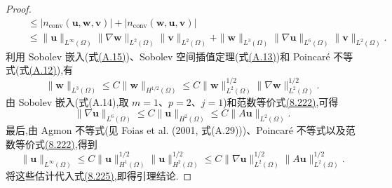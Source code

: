 \begin{lemma}[对流项的估计]
\begin{proof}
\begin{equation}
\begin{aligned}
 &\quad\le |n_{\mathrm{conv}}(\bm{u},\bm{w},\bm{v})|
            +|n_{\mathrm{conv}}(\bm{w},\bm{u},\bm{v})|\\
 &\quad\le \|\bm{u}\|_{L^\infty(\Omega)}
             \|\nabla\bm{w}\|_{L^2(\Omega)}
             \|\bm{v}\|_{L^2(\Omega)}
          +\|\bm{w}\|_{L^3(\Omega)}
             \|\nabla\bm{u}\|_{L^6(\Omega)}
             \|\bm{v}\|_{L^2(\Omega)}.
\end{aligned}
\end{equation}
利用 Sobolev 嵌入(式\hyperref[eq:appendix-a-15]{(A.15)})、Sobolev 空间插值定理(式\hyperref[eq:appendix-a-13]{(A.13)})和 Poincaré 不等式(式\hyperref[eq:appendix-a-12]{(A.12)}),有
\[
 \|\bm{w}\|_{L^3(\Omega)}
 \le C\|\bm{w}\|_{H^{1/2}(\Omega)}
 \le C\|\bm{w}\|_{L^2(\Omega)}^{1/2}
       \|\nabla\bm{w}\|_{L^2(\Omega)}^{1/2}.
\]
由 Sobolev 嵌入(式(A.14),取 $m=1$、$p=2$、$j=1$)和范数等价式\hyperref[eq:navier-stokes-alpha-stokes-norm-equivalence]{(8.222)},可得
\[
 \|\nabla\bm{u}\|_{L^6(\Omega)}
 \le C\|\bm{u}\|_{H^2(\Omega)}
 \le C\|A\bm{u}\|_{L^2(\Omega)}.
\]
最后,由 Agmon 不等式(见 Foias et al. (2001, 式(A.29)))、Poincaré 不等式以及范数等价式\hyperref[eq:navier-stokes-alpha-stokes-norm-equivalence]{(8.222)},得到
\[
 \|\bm{u}\|_{L^\infty(\Omega)}
 \le C\|\bm{u}\|_{H^1(\Omega)}^{1/2}
       \|\bm{u}\|_{H^2(\Omega)}^{1/2}
 \le C\|\nabla\bm{u}\|_{L^2(\Omega)}^{1/2}
       \|A\bm{u}\|_{L^2(\Omega)}^{1/2}.
\]
将这些估计代入式\hyperref[eq:navier-stokes-alpha-convection-bound-periodic]{(8.225)},即得引理结论.
\end{proof}
\end{lemma}

